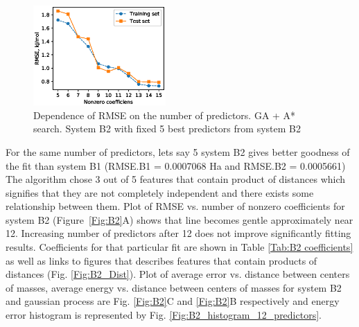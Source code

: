 \documentclass[aip,jcp,reprint,amsmath,amssymb,nature]{revtex4-1}
\begin{document}
\begin{figure}
\includegraphics[width=0.45\textwidth]{media/B2_VIP_GA_PATH_RMSE.eps}
\caption{Dependence of RMSE on the number of predictors. GA + A* search. System B2 with fixed 5 best predictors from system B2}\label{Fig:B2_VIP_RMSE}
\end{figure}


For the same number of predictors, lets say 5 system B2 gives better goodness of the fit than system B1 (RMSE.B1 = 0.0007068 Ha and RMSE.B2 = 0.0005661)   
The algorithm chose 3 out of 5 features that contain product of distances which signifies that they are not completely independent and there exists some relationship between them. Plot of RMSE vs. number of nonzero coefficients for system B2 (Figure~\ref{Fig:B2}A) shows that line becomes gentle approximately near 12. Increasing number of predictors after 12 does not improve significantly fitting results. Coefficients for that particular fit are shown in Table \ref{Tab:B2 coefficients} as well as links to figures that describes features that contain products of distances (Fig. \ref{Fig:B2_Dist}). Plot of average error vs. distance between centers of masses, average energy vs. distance between centers of masses for system B2 and gaussian process are Fig. \ref{Fig:B2}C and \ref{Fig:B2}B respectively and energy error histogram is represented by Fig. \ref{Fig:B2_histogram_12_predictors}.
\end{document}
